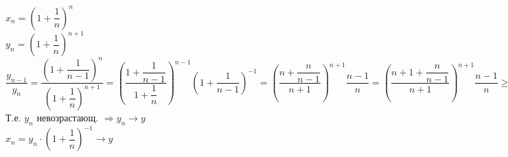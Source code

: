$ x_n = \left(1 + \dfrac{1}{n}\right)^n $\\
$ y_n =  \left(1 + \dfrac{1}{n}\right)^{n+1} $ \\
$ \dfrac{y_{n-1}}{y_n} = \dfrac{ \left(1 + \dfrac{1}{n-1}\right)^{n}}{ \left(1 + \dfrac{1}{n}\right)^{n+1}} = \left( \dfrac{1+\dfrac{1}{n-1}}{1 + \dfrac{1}{n}} \right)^{n-1} \left( 1 + \dfrac{1}{n-1} \right)^{-1}  = \left( \dfrac{n+\dfrac{n}{n-1}}{n + 1} \right)^{n+1} \dfrac{n-1}{n}  =  \left( \dfrac{n+1+\dfrac{n}{n-1}}{n + 1} \right)^{n+1} \dfrac{n-1}{n}  \geq \left(1 + (n+1)\dfrac{1}{n-1} \right)\dfrac{n-1}{n} = \left( 1+ \dfrac{1}{n-1} \right) \dfrac{n-1}{n}  = 1$\\
Т.е. $ y_n $ невозрастающ. $ \Rightarrow y_n \rightarrow y$\\
$ x_n = y_n \cdot ( 1 + \dfrac{1}{n})^{-1} \rightarrow y $ \\
